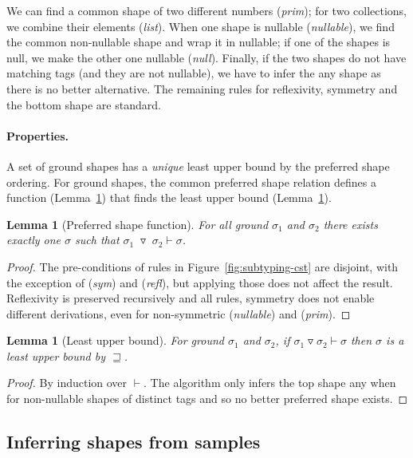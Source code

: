 \documentclass[10pt,preprint,blind,clearpagebib]{sigplanconf}
\newcommand{\kvd}[1]{\textnormal{\textcolor{kvdclr}{\sffamily #1}}}
\newcommand{\tsep}[0]{\; \triangledown \;}
\newtheorem{lemma}[theorem]{Lemma}
\begin{document}
We can find a common shape of two different numbers (\emph{prim}); for two collections,
we combine their elements (\emph{list}). When one shape is nullable (\emph{nullable}), we find
the common non-nullable shape and wrap it in \kvd{nullable}; if one of the shapes is \kvd{null}, 
we make the other one nullable (\emph{null}). Finally, if the two shapes do not have matching tags 
(and they are not nullable), we have to infer the \kvd{any} shape as there is no better alternative. 
The remaining rules for reflexivity, symmetry and the bottom shape are standard.

\paragraph{Properties.}
A set of ground shapes has a \emph{unique} least upper bound by the preferred shape ordering.
For ground shapes, the common preferred shape relation defines a function (Lemma~\ref{thm:func}) that finds 
the least upper bound (Lemma~\ref{thm:lub}). 

\begin{lemma}[Preferred shape function]
\label{thm:func}
For all ground $\sigma_1$ and $\sigma_2$ there exists exactly one $\sigma$ such that 
$\sigma_1 \tsep \sigma_2 \vdash \sigma$. 
\end{lemma}
\begin{proof}
The pre-conditions of rules in Figure~\ref{fig:subtyping-cst} are disjoint, with the exception 
of (\emph{sym}) and (\emph{refl}), but applying those does not affect the result. Reflexivity is
preserved recursively and all rules, symmetry does not enable different derivations, even for
non-symmetric (\emph{nullable}) and (\emph{prim}).
\end{proof}

\begin{lemma}[Least upper bound]
\label{thm:lub}
For ground $\sigma_1$ and $\sigma_2$, if $\sigma_1 \triangledown \sigma_2 \vdash \sigma$ then $\sigma$ is a least upper bound by $\sqsupseteq$.
\end{lemma}
\begin{proof}
By induction over $\vdash$. The algorithm only infers the top shape \kvd{any} when for non-nullable
shapes of distinct tags and so no better preferred shape exists.
\end{proof}

\subsection{Inferring shapes from samples}
\label{sec:formal-inferval}
\end{document}

